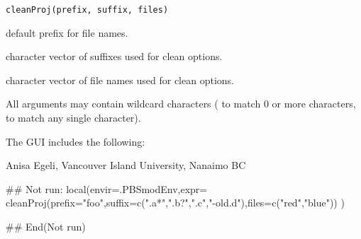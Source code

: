 \documentclass[letterpaper]{book}
\begin{document}
%
\begin{Usage}
\begin{verbatim}
cleanProj(prefix, suffix, files)
\end{verbatim}
\end{Usage}
%
\begin{Arguments}
\begin{ldescription}
\item[\code{prefix}] default prefix for file names.
\item[\code{suffix}] character vector of suffixes used for clean options.
\item[\code{files}] character vector of file names used for clean options.
\end{ldescription}
\end{Arguments}
%
\begin{Details}\relax
All arguments may contain wildcard characters ( to match 0 or
more characters,  to match any single character).

The GUI includes the following:

\end{Details}
%
\begin{Author}\relax
Anisa Egeli, Vancouver Island University, Nanaimo BC
\end{Author}
%
\begin{Examples}
\begin{ExampleCode}
## Not run: 
local(envir=.PBSmodEnv,expr={
  cleanProj(prefix="foo",suffix=c(".a*",".b?",".c","-old.d"),files=c("red","blue"))
})

## End(Not run)
\end{ExampleCode}
\end{Examples}
\end{document}
